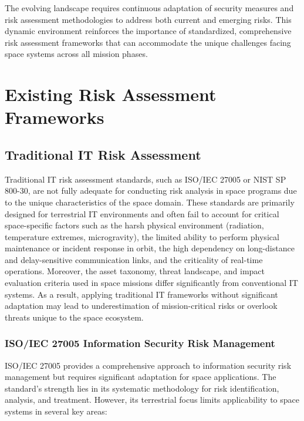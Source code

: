 \documentclass[binding=0.6cm]{sapthesis}
\begin{document}
\vspace{13pt}
The evolving landscape requires continuous adaptation of security measures and risk assessment methodologies to address both current and emerging risks. This dynamic environment reinforces the importance of standardized, comprehensive risk assessment frameworks that can accommodate the unique challenges facing space systems across all mission phases.

\section{Existing Risk Assessment Frameworks}

\subsection{Traditional IT Risk Assessment}

Traditional IT risk assessment standards, such as ISO/IEC 27005 or NIST SP 800-30, are not fully adequate for conducting risk analysis in space programs due to the unique characteristics of the space domain. These standards are primarily designed for terrestrial IT environments and often fail to account for critical space-specific factors such as the harsh physical environment (radiation, temperature extremes, microgravity), the limited ability to perform physical maintenance or incident response in orbit, the high dependency on long-distance and delay-sensitive communication links, and the criticality of real-time operations. Moreover, the asset taxonomy, threat landscape, and impact evaluation criteria used in space missions differ significantly from conventional IT systems. As a result, applying traditional IT frameworks without significant adaptation may lead to underestimation of mission-critical risks or overlook threats unique to the space ecosystem.

\subsubsection{ISO/IEC 27005 Information Security Risk Management}

ISO/IEC 27005 provides a comprehensive approach to information security risk management but requires significant adaptation for space applications. The standard's strength lies in its systematic methodology for risk identification, analysis, and treatment. However, its terrestrial focus limits applicability to space systems in several key areas:
\end{document}
